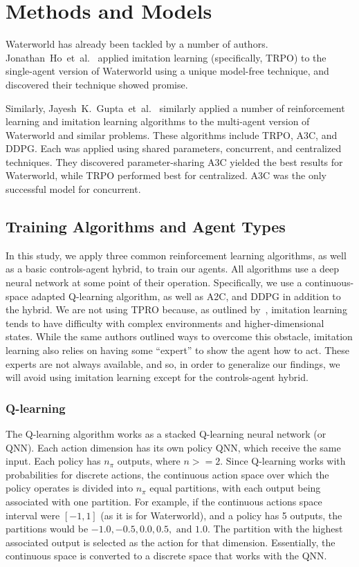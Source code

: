 \section{Methods and Models}\label{sec:methods}
Waterworld has already been tackled by a number of authors.
Jonathan~Ho~et~al.~\cite{Ho2016} applied imitation learning (specifically, TRPO) to the
single-agent version of Waterworld using a unique model-free technique, and discovered
their technique showed promise.

Similarly, Jayesh~K.~Gupta~et~al.~\cite{Gupta2017} similarly applied a number of
reinforcement learning and imitation learning algorithms to the multi-agent version
of Waterworld and similar problems.
These algorithms include TRPO, A3C, and DDPG\@.
Each was applied using shared parameters, concurrent, and centralized techniques.
They discovered parameter-sharing A3C yielded the best results for Waterworld, while
TRPO performed best for centralized.
A3C was the only successful model for concurrent.

\subsection{Training Algorithms and Agent Types}\label{subsec:training-algorithms}
In this study, we apply three common reinforcement learning algorithms, as well as a
basic controls-agent hybrid, to train our agents.
All algorithms use a deep neural network at some point of their operation.
Specifically, we use a continuous-space adapted Q-learning algorithm, as well as A2C,
and DDPG in addition to the hybrid.
We are not using TPRO because, as outlined by~\cite{Ho2016}, imitation learning tends
to have difficulty with complex environments and higher-dimensional states.
While the same authors outlined ways to overcome this obstacle, imitation learning
also relies on having some ``expert'' to show the agent how to act.
These experts are not always available, and so, in order to generalize our findings,
we will avoid using imitation learning except for the controls-agent hybrid.

\subsubsection{Q-learning}
The Q-learning algorithm works as a stacked Q-learning neural network (or QNN).
Each action dimension has its own policy QNN, which receive the same input.
Each policy has $n_\pi$ outputs, where $n >= 2$.
Since Q-learning works with probabilities for discrete actions, the continuous
action space over which the policy operates is divided into $n_\pi$ equal partitions,
with each output being associated with one partition.
For example, if the continuous actions space interval were $[-1, 1]$ (as it is for
Waterworld), and a policy has 5 outputs, the partitions would be $-1.0, -0.5, 0.0, 0.5,
\text{ and } 1.0$.
The partition with the highest associated output is selected as the action for that
dimension.
Essentially, the continuous space is converted to a discrete space that works with
the QNN\@.

